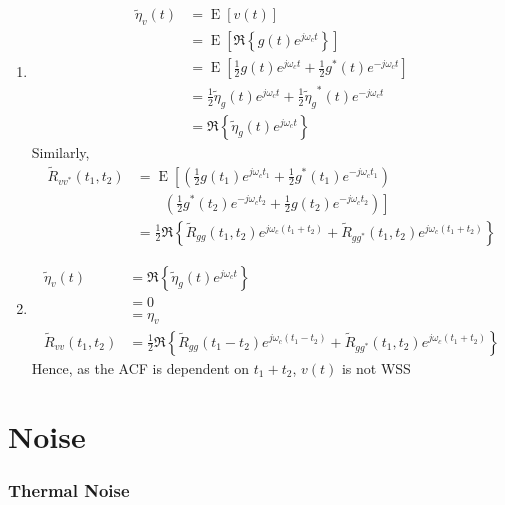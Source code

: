 \documentclass[titlepage, fleqn, a4paper, 12pt, twoside]{article}
\theoremstyle{definition}
\theoremstyle{theorem}
\renewcommand{\tilde}{\widetilde}
\DeclareMathOperator{\expct}{\mathrm{E}}
\begin{document}
\begin{solution}
	\begin{enumerate}
		\item
			\begin{align*}
				\tilde{\eta}_v(t) &= \expct\left[ v(t) \right]\\
				&= \expct\left[ \Re\left\{ g(t) e^{j \omega_c t} \right\} \right]\\
				&= \expct\left[ \frac{1}{2} g(t) e^{j \omega_c t} + \frac{1}{2} g^*(t) e^{-j \omega_c t} \right]\\
				&= \frac{1}{2} \tilde{\eta}_g(t) e^{j \omega_c t} + \frac{1}{2} {\tilde{\eta}_g}^*(t) e^{-j \omega_c t}\\
				&= \Re\left\{ \tilde{\eta}_g(t) e^{j \omega_c t} \right\}
			\end{align*}
			Similarly,
			\begin{align*}
				\tilde{R}_{v v^*}(t_1,t_2) &= \expct\left[ \left( \frac{1}{2} g(t_1) e^{j \omega_c t_1} + \frac{1}{2} g^*(t_1) e^{-j \omega_c t_1} \right) \right.\\
				&\quad\quad \left. \left( \frac{1}{2} g^*(t_2) e^{-j \omega_c t_2} + \frac{1}{2} g(t_2) e^{-j \omega_c t_2} \right) \right]\\
				&= \frac{1}{2} \Re\left\{ \tilde{R}_{g g}(t_1,t_2) e^{j \omega_c (t_1 + t_2)} + \tilde{R}_{g g^*}(t_1,t_2) e^{j \omega_c (t_1 + t_2)} \right\}
			\end{align*}
		\item
			\begin{align*}
				\tilde{\eta}_v(t) &= \Re\left\{ \tilde{\eta}_g(t) e^{j \omega_c t} \right\}\\
				&= 0\\
				&= \eta_v\\
				\tilde{R}_{v v}(t_1,t_2) &= \frac{1}{2} \Re\left\{ \tilde{R}_{g g}(t_1 - t_2) e^{j \omega_c (t_1 - t_2)} + \tilde{R}_{g g^*}(t_1,t_2) e^{j \omega_c (t_1 + t_2)} \right\}
			\end{align*}
			Hence, as the ACF is dependent on $t_1 + t_2$, $v(t)$ is not WSS
	\end{enumerate}
\end{solution}

\clearpage
\part{Noise}

\section{Thermal Noise}
\end{document}

